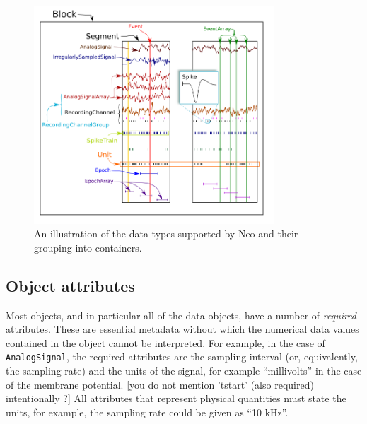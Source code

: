 \documentclass{frontiers}
\newcommand{\samuel}[1]{[\textcolor{RubineRed}{#1}]}
\begin{document}
\begin{figure}
\centering
\includegraphics[width=0.8\textwidth]{figures/base_schematic2_lowres}
\caption{An illustration of the data types supported by Neo and their grouping into containers.}\label{fig:overview} 
\end{figure}
%
%
%


\subsection{Object attributes}

Most objects, and in particular all of the data objects, have a number of \emph{required} attributes.
These are essential metadata without which the numerical data values contained in the object cannot be interpreted.
For example, in the case of \lstinline`AnalogSignal`, the required attributes are the sampling interval (or, equivalently, the sampling rate) and the units of the signal, for example ``millivolts'' in the case of the membrane potential. \samuel{you do not mention 'tstart' (also required) intentionally ?} 
All attributes that represent physical quantities must state the units, for example, the sampling rate could be given as ``10 kHz''.
\end{document}
